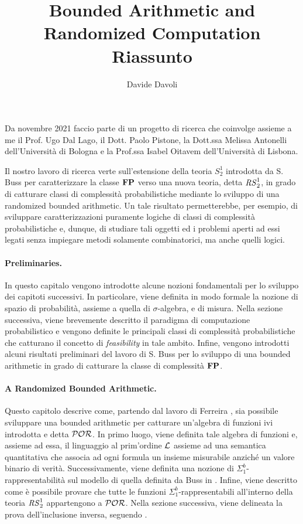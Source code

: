 \documentclass{article}
\title{Bounded Arithmetic and Randomized Computation \\[1.5ex] \Large Riassunto}
\author{Davide Davoli}
\begin{document}
\maketitle
Da novembre 2021 faccio parte di un progetto di ricerca che coinvolge assieme a me il Prof. Ugo Dal Lago, il Dott. Paolo Pistone, la Dott.ssa Melissa Antonelli dell'Università di Bologna e la Prof.ssa Isabel Oitavem dell'Università di Lisbona.

Il nostro lavoro di ricerca verte sull'estensione della teoria $S^1_2$ introdotta da S. Buss \cite{Buss86} per caratterizzare la classe $\mathbf{FP}$ \cite{Cobham1965} verso una nuova teoria, detta ${\mathit{RS}^1_2}$, in grado di catturare classi di complessità probabilistiche mediante lo sviluppo di una randomized bounded arithmetic.
%
Un tale risultato permetterebbe, per esempio, di sviluppare caratterizzazioni
puramente logiche di classi di complessità probabilistiche e, dunque,
di studiare tali oggetti ed i problemi aperti ad essi legati senza impiegare metodi
solamente combinatorici, ma anche quelli logici.

\paragraph*{Preliminaries.} In questo capitalo vengono introdotte alcune nozioni
fondamentali per lo sviluppo dei capitoti successivi. In particolare,
viene definita in modo formale la nozione di spazio di probabilità, assieme a quella
di $\sigma$-algebra, e di misura. Nella sezione successiva, viene brevemente descritto
il paradigma di computazione probabilistico e vengono definite le principali classi di
complessità probabilistiche che catturano il concetto di \emph{feasibility} in tale ambito. Infine, vengono introdotti alcuni risultati preliminari del lavoro di S. Buss per lo sviluppo di una bounded arithmetic in grado di catturare la classe di complessità $\mathbf{FP}$.

\paragraph*{A Randomized Bounded Arithmetic.}
Questo capitolo descrive come, partendo dal lavoro di Ferreira \cite{Ferreira88}, sia possibile sviluppare una bounded arithmetic per catturare un'algebra di funzioni ivi introdotta e detta $\mathcal{POR}$. In primo luogo, viene definita tale algebra di funzioni e, assieme ad essa, il linguaggio al prim'ordine $\mathcal{L}$ assieme ad una semantica quantitativa che associa ad ogni formula un insieme misurabile anziché un valore binario di verità. Successivamente, viene definita una nozione di $\Sigma^b_1$-rappresentabilità sul modello di quella definita da Buss in \cite{}. Infine, viene descritto come è possibile provare che tutte le funzioni $\Sigma^b_1$-rappresentabili all'interno della teoria ${\mathit{RS}^1_2}$ appartengono a $\mathcal{POR}$. Nella sezione successiva, viene delineata la prova dell'inclusione inversa, seguendo \cite{}.
\end{document}
